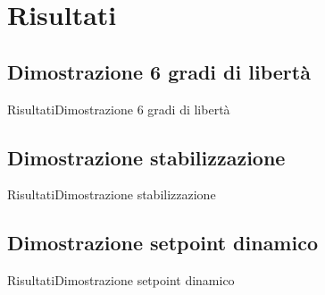 \documentclass[10pt,aspectratio=169
	]{beamer}
\begin{document}
	\section{Risultati}
	
	\subsection{Dimostrazione 6 gradi di libertà}
	\begin{frame}{Risultati}{Dimostrazione 6 gradi di libertà}
	\centering{}
	\end{frame}
	\subsection{Dimostrazione stabilizzazione}
	\begin{frame}{Risultati}{Dimostrazione stabilizzazione}
	\centering{}

	\end{frame}
	
	\subsection{Dimostrazione setpoint dinamico}
	\begin{frame}{Risultati}{Dimostrazione setpoint dinamico}
	\centering{}

	\end{frame}
	
	\begin{frame}
	\end{frame}
\end{document}
